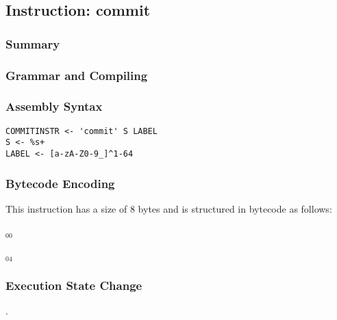 \subsection{Instruction: commit}

\subsubsection{Summary}


\subsubsection{Grammar and Compiling}


\subsubsection{Assembly Syntax}

\begin{myquote}
\begin{verbatim}
COMMITINSTR <- 'commit' S LABEL
S <- %s+
LABEL <- [a-zA-Z0-9_]^1-64
\end{verbatim}
\end{myquote}


\subsubsection{Bytecode Encoding}

This instruction has a size of 8 bytes and is structured in bytecode as follows:

$_{00}$\ 



$_{04}$\ 


\subsubsection{Execution State Change}

.


